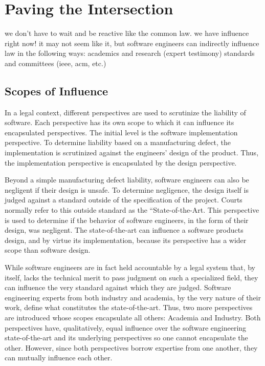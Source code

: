 \documentclass[12pt]{report}
\begin{document}
\chapter{Paving the Intersection} 
we don't have to wait and be reactive like the common law. we have influence right now! it may not seem like it, but software engineers can indirectly influence law in the following ways: 
academics and research (expert testimony) 
standards and committees (ieee, acm, etc.) 

\section{Scopes of Influence} 

In a legal context, different perspectives are used to scrutinize the liability of software. Each perspective has its own scope to which it can influence its encapsulated perspectives. The initial level is the software implementation perspective. To determine liability based on a manufacturing defect, the implementation is scrutinized against the engineers' design of the product. Thus, the implementation perspective is encapsulated by the design perspective. 

Beyond a simple manufacturing defect liability, software engineers can also be negligent if their design is unsafe. To determine negligence, the design itself is judged against a standard outside of the specification of the project. Courts normally refer to this outside standard as the ``State-of-the-Art. This perspective is used to determine if the behavior of software engineers, in the form of their design, was negligent. The state-of-the-art can influence a software products design, and by virtue its implementation, because its perspective has a wider scope than software design. 

While software engineers are in fact held accountable by a legal system that, by itself, lacks the technical merit to pass judgment on such a specialized field, they can influence the very standard against which they are judged. Software engineering experts from both industry and academia, by the very nature of their work, define what constitutes the state-of-the-art. Thus, two more perspectives are introduced whose scopes encapsulate all others: Academia and Industry. Both perspectives have, qualitatively, equal influence over the software engineering state-of-the-art and its underlying perspectives so one cannot encapsulate the other. However, since both perspectives borrow expertise from one another, they can mutually influence each other. 
\end{document}
